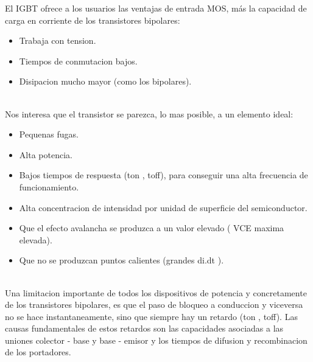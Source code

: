 \documentclass[11pt,a4paper]{article}
\begin{document}
El IGBT ofrece a los usuarios las ventajas de entrada MOS, más la capacidad de carga en corriente de los transistores bipolares:\\
\begin{itemize}
\item Trabaja con tension. 
\item Tiempos de conmutacion bajos. 
\item Disipacion mucho mayor (como los bipolares).
\end{itemize}\\
Nos interesa que el transistor se parezca, lo mas posible, a un elemento ideal:\\
\begin{itemize}
\item Pequenas fugas. 
\item Alta potencia.
\item Bajos tiempos de respuesta (ton , toff), para conseguir una alta frecuencia de funcionamiento. 
\item Alta concentracion de intensidad por unidad de superficie del semiconductor. 
\item Que el efecto avalancha se produzca a un valor elevado ( VCE maxima elevada). 
\item Que no se produzcan puntos calientes (grandes di.dt ).
\end{itemize}\\
Una limitacion importante de todos los dispositivos de potencia y concretamente de los transistores bipolares, es que el paso de bloqueo a conduccion y viceversa no se hace instantaneamente, sino que siempre hay un retardo (ton , toff). Las causas fundamentales de estos retardos son las capacidades asociadas a las uniones colector - base y base - emisor y los tiempos de difusion y recombinacion de los portadores.\\
\end{document}
